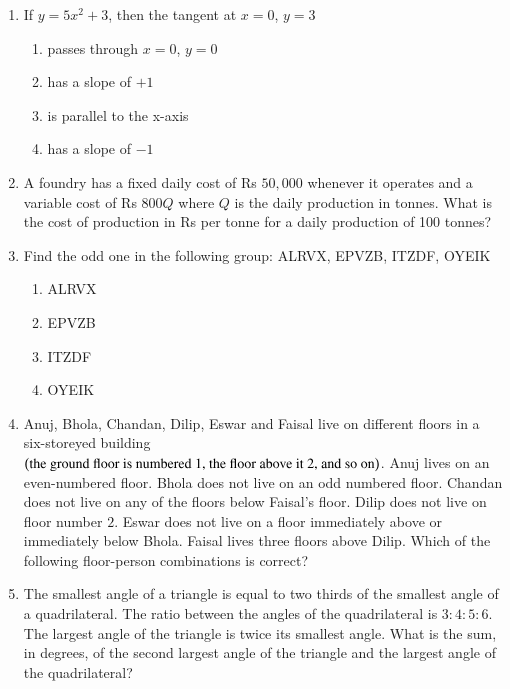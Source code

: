 \documentclass[journal,12pt,onecolumn]{IEEEtran}
\theoremstyle{remark}
\begin{document}
\begin{enumerate}
\item If $y = 5x^2 + 3$, then the tangent at $x = 0$, $y = 3$
\hfill{}
\begin{enumerate}
\item passes through $x=0$, $y=0$
\item has a slope of $+1$
\item is parallel to the x-axis
\item has a slope of $-1$
\end{enumerate}

\item A foundry has a fixed daily cost of Rs $50,000$ whenever it operates and a variable cost of Rs $800Q$ where $Q$ is the daily production in tonnes. What is the cost of production in Rs per tonne for a daily production of 100 tonnes?
\hfill{}

\item Find the odd one in the following group: ALRVX, EPVZB, ITZDF, OYEIK
\hfill{}
\begin{enumerate}
\item ALRVX
\item EPVZB
\item ITZDF
\item OYEIK
\end{enumerate}

\item Anuj, Bhola, Chandan, Dilip, Eswar and Faisal live on different floors in a six-storeyed building$\left(\text{the ground floor is numbered 1, the floor above it 2, and so on}\right)$. Anuj lives on an even-numbered floor. Bhola does not live on an odd numbered floor. Chandan does not live on any of the floors below Faisal's floor. Dilip does not live on floor number $2$. Eswar does not live on a floor immediately above or immediately below Bhola. Faisal lives three floors above Dilip. Which of the following floor-person combinations is correct?\\
\hfill{}
\begin{center}

\end{center}

\item The smallest angle of a triangle is equal to two thirds of the smallest angle of a quadrilateral. The ratio between the angles of the quadrilateral is $3:4:5:6$. The largest angle of the triangle is twice its smallest angle. What is the sum, in degrees, of the second largest angle of the triangle and the largest angle of the quadrilateral?
\hfill{}


\end{enumerate}
\end{document}

